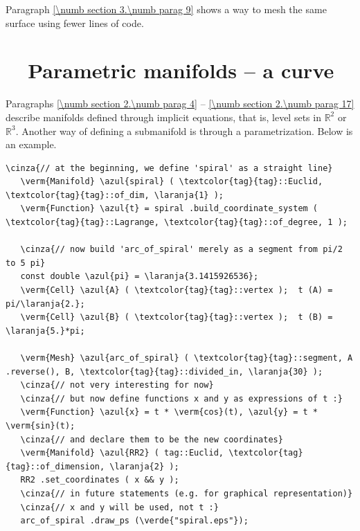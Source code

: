 Paragraph \ref{\numb section 3.\numb parag 9} shows a way to mesh the same surface using
fewer lines of code.


\section{~~Parametric manifolds -- a curve}\label{\numb section 2.\numb parag 18}

Paragraphs \ref{\numb section 2.\numb parag 4} -- \ref{\numb section 2.\numb parag 17} describe
manifolds defined through implicit equations, that is, level sets in $ \mathbb{R}^2 $ or
$ \mathbb{R}^3 $.
Another way of defining a submanifold is through a parametrization.
Below is an example.

\begin{Verbatim}[commandchars=\\\{\},formatcom=\small\tt,frame=single,
   label=parag-\ref{\numb section 2.\numb parag 18}.cpp,rulecolor=\color{moldura},
   baselinestretch=0.94,framesep=2mm]
   \cinza{// at the beginning, we define 'spiral' as a straight line}
   \verm{Manifold} \azul{spiral} ( \textcolor{tag}{tag}::Euclid, \textcolor{tag}{tag}::of_dim, \laranja{1} );
   \verm{Function} \azul{t} = spiral .build_coordinate_system ( \textcolor{tag}{tag}::Lagrange, \textcolor{tag}{tag}::of_degree, 1 );

   \cinza{// now build 'arc_of_spiral' merely as a segment from pi/2 to 5 pi}
   const double \azul{pi} = \laranja{3.1415926536};
   \verm{Cell} \azul{A} ( \textcolor{tag}{tag}::vertex );  t (A) = pi/\laranja{2.};
   \verm{Cell} \azul{B} ( \textcolor{tag}{tag}::vertex );  t (B) = \laranja{5.}*pi;

   \verm{Mesh} \azul{arc_of_spiral} ( \textcolor{tag}{tag}::segment, A .reverse(), B, \textcolor{tag}{tag}::divided_in, \laranja{30} );
   \cinza{// not very interesting for now}
   \cinza{// but now define functions x and y as expressions of t :}
   \verm{Function} \azul{x} = t * \verm{cos}(t), \azul{y} = t * \verm{sin}(t);
   \cinza{// and declare them to be the new coordinates}
   \verm{Manifold} \azul{RR2} ( tag::Euclid, \textcolor{tag}{tag}::of_dimension, \laranja{2} );
   RR2 .set_coordinates ( x && y );
   \cinza{// in future statements (e.g. for graphical representation)}
   \cinza{// x and y will be used, not t :}
   arc_of_spiral .draw_ps (\verde{"spiral.eps"});
\end{Verbatim}

